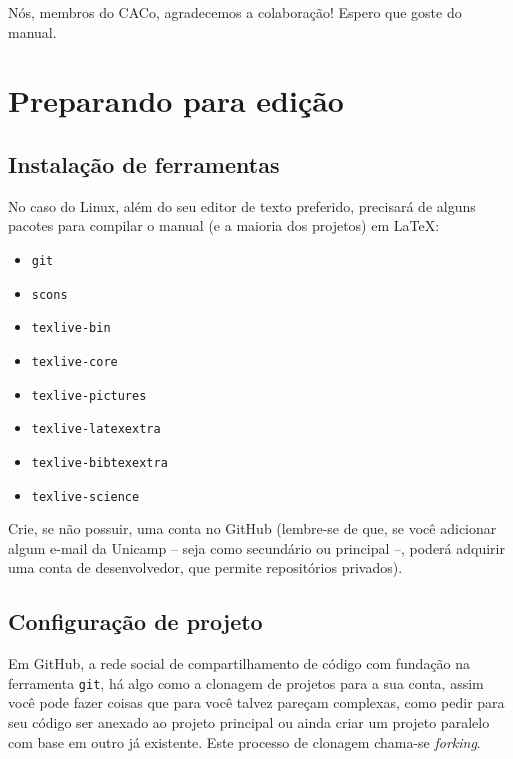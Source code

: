 \documentclass[a4paper,oneside,10pt]{memoir}
\begin{document}
Nós, membros do CACo, agradecemos a colaboração! Espero que goste do manual.

\mainmatter

\chapter{Preparando para edição}

\section{Instalação de ferramentas}

No caso do Linux, além do seu editor de texto preferido, precisará de alguns
pacotes para compilar o manual (e a maioria dos projetos) em \LaTeX:

\begin{multicols}{2}
\begin{itemize}[noitemsep] %
\item \texttt{git}
\item \texttt{scons}
\item \texttt{texlive-bin}
\item \texttt{texlive-core}
\item \texttt{texlive-pictures}
\item \texttt{texlive-latexextra}
\item \texttt{texlive-bibtexextra}
\item \texttt{texlive-science}
\end{itemize}
\end{multicols}

Crie, se não possuir, uma conta no GitHub (lembre-se de que, se você adicionar
algum e-mail da Unicamp -- seja como secundário ou principal --, poderá
adquirir uma conta de desenvolvedor, que permite repositórios privados).

\section{Configuração de projeto}

Em GitHub, a rede social de compartilhamento de código com fundação na
ferramenta \texttt{git}, há algo como a clonagem de projetos para a sua conta,
assim você pode fazer coisas que para você talvez pareçam complexas, como pedir
para seu código ser anexado ao projeto principal ou ainda criar um projeto
paralelo com base em outro já existente. Este processo de clonagem chama-se
\emph{forking}.
\end{document}
